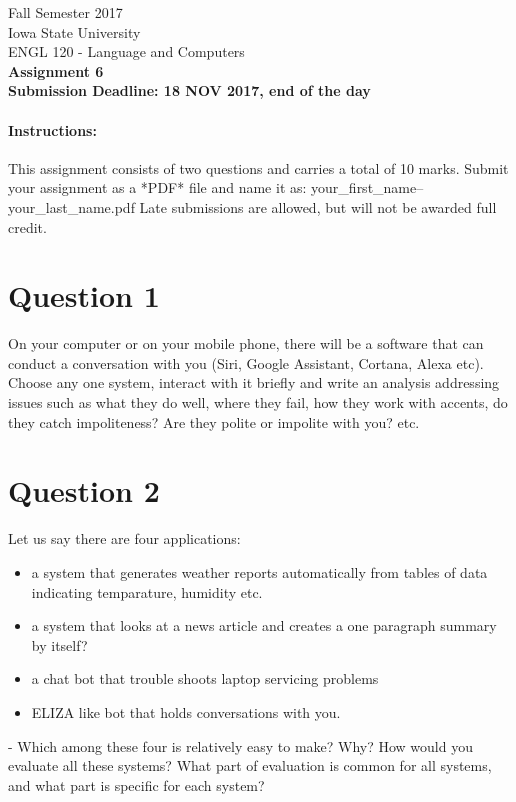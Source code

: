 \documentclass[11pt,a4paper]{article}
\begin{document}
\begin{center}
  Fall Semester 2017 \\ Iowa State University\\[3ex]
  {\large ENGL 120 - Language and Computers}\\[3ex]
  \textbf{Assignment 6} \\ \textbf{Submission Deadline: 18 NOV 2017, end of the day}
\end{center}

\paragraph{Instructions:} This assignment consists of two questions and carries a total of 10 marks. Submit your assignment as a *PDF* file and name it as: your\_first\_name--your\_last\_name.pdf Late submissions are allowed, but will not be awarded full credit. 

\section*{Question 1} 
On your computer or on your mobile phone, there will be a software that can conduct a conversation with you (Siri, Google Assistant, Cortana, Alexa etc). Choose any one system, interact with it briefly and write an analysis addressing issues such as what they do well, where they fail, how they work with accents, do they catch impoliteness? Are they polite or impolite with you? etc.

\section*{Question 2}
Let us say there are four applications:
\begin{itemize} 
\item a system that generates weather reports automatically from tables of data indicating temparature, humidity etc.
\item a system that looks at a news article and creates a one paragraph summary by itself?
\item a chat bot that trouble shoots laptop servicing problems
\item ELIZA like bot that holds conversations with you.
\end{itemize}
- Which among these four is relatively easy to make? Why? How would you evaluate all these systems? What part of evaluation is common for all systems, and what part is specific for each system?
\end{document}
